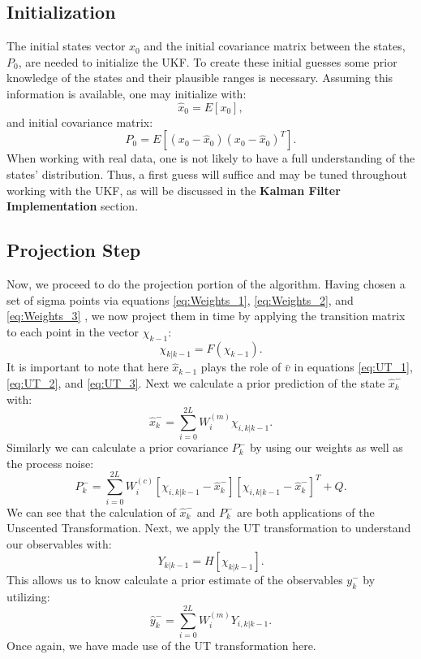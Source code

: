 \documentclass{article}
\begin{document}
    \subsection{Initialization}
    The initial states vector $x_0$ and the initial covariance matrix between the states, $P_0$, are needed to initialize the UKF. To create these initial guesses some prior knowledge of the states and their plausible ranges is necessary. Assuming this information is available, one may initialize with:
    \begin{equation}
    \hat{x}_0 = E[x_0],
    \end{equation}
    and initial covariance matrix:
    \begin{equation}
    P_0 = E[(x_0 - \hat{x}_0)(x_0 - \hat{x}_0)^T].
    \end{equation}
    \cite{VanMereChapter}
    When working with real data, one is not likely to have a full understanding of the states' distribution. Thus, a first guess will suffice and may be tuned throughout working with the UKF, as will be discussed in the \textbf{Kalman Filter Implementation} section.  
    \subsection{Projection Step}
    Now, we proceed to do the projection portion of the algorithm. \cite{VanMereChapter} Having chosen a set of sigma points via equations \ref{eq:Weights_1}, \ref{eq:Weights_2}, and \ref{eq:Weights_3} , we now project them in time by applying the transition matrix to each point in the vector $\chi_{k-1}$:
    \begin{equation}
    \chi_{k|k-1} = F(\chi_{k-1}).
    \end{equation}
    It is important to note that here $\hat{x}_{k-1}$ plays the role of $\bar{v}$ in equations \ref{eq:UT_1}, \ref{eq:UT_2}, and \ref{eq:UT_3}.
    Next we calculate a prior prediction of the state $\hat{x}_k^-$ with:
    \begin{equation}
    \hat{x}_k^- = \sum_{i = 0}^{2L} W_i^{(m)} \chi_{i, k|k-1}.
    \end{equation}
    Similarly we can calculate a prior covariance $P_k^-$ by using our weights as well as the process noise:
    \begin{equation}
    P_k^- = \sum_{i = 0}^{2L} W_i^{(c)} [\chi_{i, k|k-1} - \hat{x}_k^-][\chi_{i, k|k-1} - \hat{x}_k^-]^T + Q.
    \end{equation}
    We can see that the calculation of $\hat{x}_k^-$ and $P_k^-$ are both applications of the Unscented Transformation. Next, we apply the UT transformation to understand our observables with:
    \begin{equation}
    Y_{k|k-1} = H[\chi_{k|k-1}].
    \end{equation}
    This allows us to know calculate a prior estimate of the observables $y_k^-$ by utilizing:
    \begin{equation}
    \hat{y}_k^- = \sum_{i=0}^{2L} W_i^{(m)} Y_{i,k|k-1}.
    \end{equation}
     Once again, we have made use of the UT transformation here.
\end{document}
